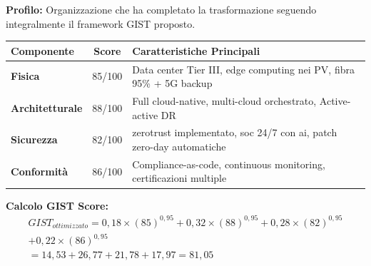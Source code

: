 \begin{tcolorbox}[
    colback=green!5!white,
    colframe=green!75!black,
    title={\textbf{Scenario 3:} GDO con Framework GIST Completo},
    fonttitle=\bfseries,
    boxrule=1.5pt,
    arc=2mm,
    breakable,
    width=\textwidth
]

\textbf{Profilo:} Organizzazione che ha completato la trasformazione seguendo integralmente il framework GIST proposto.

\begin{center}
\begin{tabularx}{\textwidth}{l c X}
\toprule
\textbf{Componente} & \textbf{Score} & \textbf{Caratteristiche Principali} \\
\midrule
\textbf{Fisica} & 85/100 & Data center Tier III, edge computing nei PV, fibra 95\% + 5G backup \\
\textbf{Architetturale} & 88/100 & Full cloud-native, multi-cloud orchestrato, Active-active DR \\
\textbf{Sicurezza} & 82/100 & \gls{zerotrust} implementato, \gls{soc} 24/7 con \gls{ai}, patch zero-day automatiche \\
\textbf{Conformità} & 86/100 & Compliance-as-code, continuous monitoring, certificazioni multiple \\
\bottomrule
\end{tabularx}
\end{center}

\textbf{Calcolo GIST Score:}
\begin{multline}
GIST_{ottimizzato} = 0,18 \times (85)^{0,95} + 0,32 \times (88)^{0,95} + 0,28 \times (82)^{0,95} \\ + 0,22 \times (86)^{0,95} \\
= 14,53 + 26,77 + 21,78 + 17,97 = \boxed{81,05}
\end{multline}

\end{tcolorbox}

